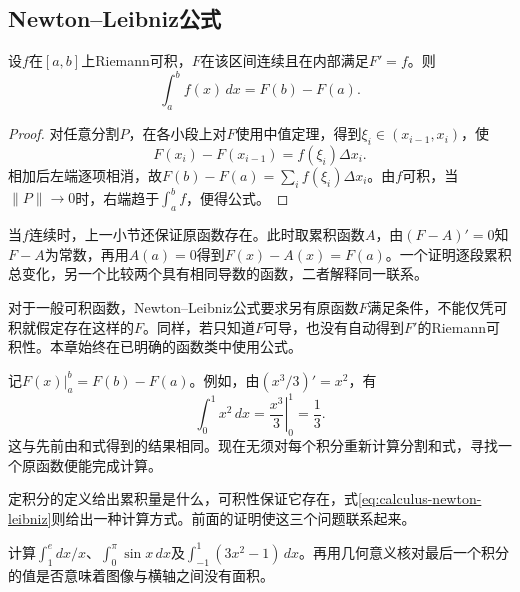 \newpage
\subsection{Newton--Leibniz公式}

\begin{theorem}\label{thm:calculus-newton-leibniz}
设\(f\)在\([a,b]\)上Riemann可积，\(F\)在该区间连续且在内部满足\(F'=f\)。则
\begin{equation}\label{eq:calculus-newton-leibniz}
 \int_a^b f(x)\,dx=F(b)-F(a).
\end{equation}
\end{theorem}

\begin{proof}
对任意分割\(P\)，在各小段上对\(F\)使用中值定理，得到\(\xi_i\in(x_{i-1},x_i)\)，使
\begin{equation*}
 F(x_i)-F(x_{i-1})=f(\xi_i)\Delta x_i.
\end{equation*}
相加后左端逐项相消，故\(F(b)-F(a)=\sum_i f(\xi_i)\Delta x_i\)。由\(f\)可积，当\(\|P\|\to0\)时，右端趋于\(\int_a^bf\)，便得公式。
\end{proof}

当\(f\)连续时，上一小节还保证原函数存在。此时取累积函数\(A\)，由\((F-A)'=0\)知\(F-A\)为常数，再用\(A(a)=0\)得到\(F(x)-A(x)=F(a)\)。一个证明逐段累积总变化，另一个比较两个具有相同导数的函数，二者解释同一联系。

对于一般可积函数，Newton--Leibniz公式要求另有原函数\(F\)满足条件，不能仅凭可积就假定存在这样的\(F\)。同样，若只知道\(F\)可导，也没有自动得到\(F'\)的Riemann可积性。本章始终在已明确的函数类中使用公式。

记\(\left.F(x)\right|_a^b=F(b)-F(a)\)。例如，由\((x^3/3)'=x^2\)，有
\begin{equation*}
 \int_0^1x^2\,dx=\left.\frac{x^3}{3}\right|_0^1=\frac13.
\end{equation*}
这与先前由和式得到的结果相同。现在无须对每个积分重新计算分割和式，寻找一个原函数便能完成计算。

定积分的定义给出累积量是什么，可积性保证它存在，式\eqref{eq:calculus-newton-leibniz}则给出一种计算方式。前面的证明使这三个问题联系起来。

\begin{example}
计算\(\int_1^e dx/x\)、\(\int_0^\pi\sin x\,dx\)及\(\int_{-1}^1(3x^2-1)\,dx\)。再用几何意义核对最后一个积分的值是否意味着图像与横轴之间没有面积。
\end{example}

